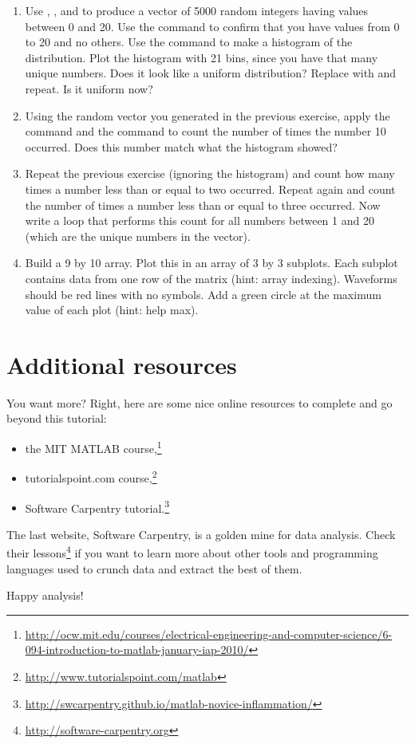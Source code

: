 \documentclass{article}
\begin{document}
\begin{enumerate}

\item Use , , and \mcode{*} to produce a vector of 5000 random integers having values between 0 and 20.
Use the  command to confirm that you have values from 0 to 20 and no others.
Use the  command to make a histogram of the distribution.
Plot the histogram with 21 bins, since you have that many unique numbers.
Does it look like a uniform distribution? Replace  with  and repeat.
Is it uniform now?

\item Using the random vector you generated in the previous exercise, apply the  command and the  command to count the number of times the number 10 occurred.
  Does this number match what the histogram showed?

\item Repeat the previous exercise (ignoring the histogram) and count how many times a number less than or equal to two occurred.
  Repeat again and count the number of times a number less than or equal to three occurred.
  Now write a  loop that performs this count for all numbers between 1 and 20 (which are the unique numbers in the vector).

\item Build a 9 by 10 array. Plot this in an array of 3 by 3 subplots.
  Each subplot contains data from one row of the matrix (hint: array indexing).
  Waveforms should be red lines with no symbols.
  Add a green circle at the maximum value of each plot (hint: help max).

\end{enumerate}

\section{Additional resources}

You want more?
Right, here are some nice online resources to complete and go beyond this tutorial:
\begin{itemize}
  \item the MIT MATLAB course,\footnote{%
    \url{http://ocw.mit.edu/courses/electrical-engineering-and-computer-science/6-094-introduction-to-matlab-january-iap-2010/}
  }
  \item tutorialspoint.com course,\footnote{%
    \url{http://www.tutorialspoint.com/matlab}
  }
  \item Software Carpentry tutorial.\footnote{%
    \url{http://swcarpentry.github.io/matlab-novice-inflammation/}
  }
\end{itemize}

The last website, Software Carpentry, is a golden mine for data analysis.
Check their lessons\footnote{\url{http://software-carpentry.org}} if you want to learn more about other tools and programming languages used to crunch data and extract the best of them.

Happy analysis!
\end{document}
